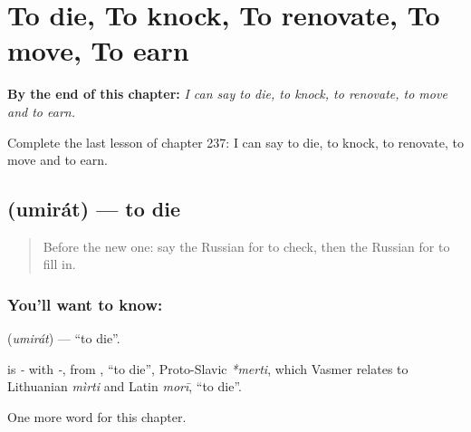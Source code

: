 
\chapter{To die, To knock, To renovate, To move, To earn}
\label{ch:ru-to-die-to-knock-to-renovate-to-move-to-earn}

\begin{chapteropening}
\textbf{By the end of this chapter:} \emph{I can say to die, to knock, to renovate, to move and to earn.}

Complete the last lesson of chapter 237: I can say to die, to knock, to renovate, to move and to earn.
\end{chapteropening}

\section[\texorpdfstring{\ru{умирать} (umirát)}{умирать (umirát)}]{ (umirát) — to die}

\label{lesson:RU-C237-umirat}



\begin{quote}
Before the new one: say the Russian for to check, then the Russian for to fill in.
\end{quote}

\subsection*{You'll want to know: }
\textbf{} (\emph{umirát}) — \textquotedblleft{}to die\textquotedblright{}.

\begin{cousinweb}
\textbf{} is \emph{-} with \emph{-}, from \emph{}, \textquotedblleft{}to die\textquotedblright{}, Proto-Slavic \emph{*merti}, which Vasmer relates to Lithuanian \emph{mìrti} and Latin \emph{morī}, \textquotedblleft{}to die\textquotedblright{}.
\end{cousinweb}

\begin{grammarlens}[title={What you've built}]
One more word for this chapter.
\end{grammarlens}

